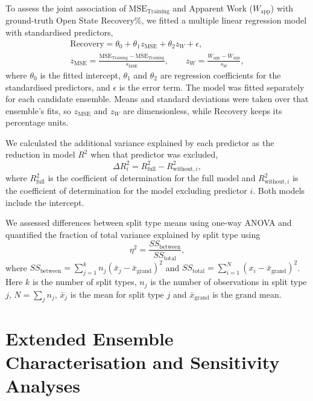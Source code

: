 To assess the joint association of $\text{MSE}_\text{Training}$ and Apparent Work ($W_\text{app}$) with ground-truth Open State Recovery\%, we fitted a multiple linear regression model with standardised predictors,
\begin{equation}
    \begin{gathered}
    \text{Recovery} = \theta_0 + \theta_1 z_\text{MSE} + \theta_2 z_W + \epsilon,\\
    z_\text{MSE}=\frac{\text{MSE}_\text{Training}-\overline{\text{MSE}}_\text{Training}}{s_\text{MSE}},
    \qquad
    z_W=\frac{W_\text{app}-\overline{W}_\text{app}}{s_W},
    \end{gathered}
    \label{eq:valdx-recovery-regression}
\end{equation}
where $\theta_0$ is the fitted intercept, $\theta_1$ and $\theta_2$ are regression coefficients for the standardised predictors, and $\epsilon$ is the error term. The model was fitted separately for each candidate ensemble. Means and standard deviations were taken over that ensemble's fits, so $z_\text{MSE}$ and $z_W$ are dimensionless, while Recovery keeps its percentage units.

We calculated the additional variance explained by each predictor as the reduction in model $R^2$ when that predictor was excluded,
\begin{equation}
    \Delta R^2_i = R^2_\text{full} - R^2_{\text{without},i},
    \label{eq:valdx-delta-r2}
\end{equation}
where $R^2_\text{full}$ is the coefficient of determination for the full model and $R^2_{\text{without},i}$ is the coefficient of determination for the model excluding predictor $i$. Both models include the intercept.

We assessed differences between split type means using one-way ANOVA and quantified the fraction of total variance explained by split type using
\begin{equation}
    \eta^2 = \frac{SS_\text{between}}{SS_\text{total}},
    \label{eq:valdx-eta-squared}
\end{equation}
where $SS_\text{between} = \sum_{j=1}^{k} n_j(\bar{x}_j - \bar{x}_\text{grand})^2$ and $SS_\text{total} = \sum_{i=1}^{N}(x_i - \bar{x}_\text{grand})^2$. Here $k$ is the number of split types, $n_j$ is the number of observations in split type $j$, $N=\sum_j n_j$, $\bar{x}_j$ is the mean for split type $j$ and $\bar{x}_\text{grand}$ is the grand mean.

\clearpage
\section{Extended Ensemble Characterisation and Sensitivity Analyses}
\label{app:valdx-supporting-results}

